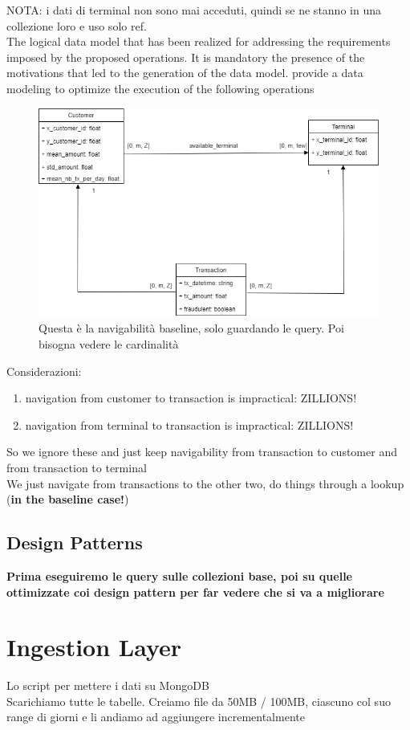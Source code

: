 \documentclass[letterpaper,11pt]{article}
\begin{document}
NOTA: i dati di terminal non sono mai acceduti, quindi se ne stanno in una collezione loro e uso solo ref.
\\
The logical data model that has been realized for addressing the requirements imposed by the proposed operations. It is mandatory the presence of the motivations that led to the generation of the data model.
provide a data modeling to optimize the execution of the following operations
\begin{figure}[ht] 
        \centering \includegraphics[width=0.9\columnwidth]{images/MongoBaselineNavigability.png}
        \caption{\label{fig1}Questa è la navigabilità baseline, solo guardando le query. Poi bisogna vedere le cardinalità}
\end{figure}
Considerazioni:
\begin{enumerate}
    \item navigation from customer to transaction is impractical: ZILLIONS!
    \item navigation from terminal to transaction is impractical: ZILLIONS!
\end{enumerate}
So we ignore these and just keep navigability from transaction to customer and from transaction to terminal\\
We just navigate from transactions to the other two, do things through a lookup (\textbf{in the baseline case!})
\subsection{Design Patterns}
\textbf{Prima eseguiremo le query sulle collezioni base, poi su quelle ottimizzate coi design pattern per far vedere che si va a migliorare}

\section{Ingestion Layer}
Lo script per mettere i dati su MongoDB\\
Scarichiamo tutte le tabelle. Creiamo file da 50MB / 100MB, ciascuno col suo range di giorni e li andiamo ad aggiungere incrementalmente
\end{document}
